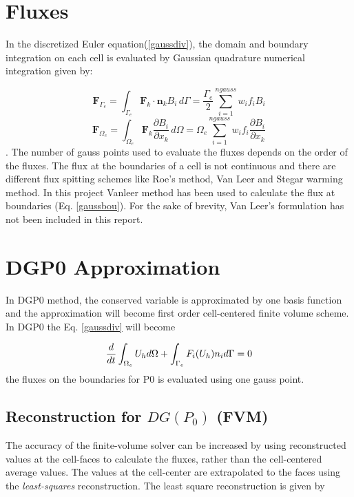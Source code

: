 \documentclass[12pt]{elsarticle}
\begin{document}
	\section{Fluxes}
	In the discretized Euler equation(\ref{gaussdiv}), the domain and boundary integration on each cell is evaluated by Gaussian quadrature numerical integration given by:
	
	\begin{equation}\label{gaussbou}
		\mathbf{F}_{\Gamma_e} = \int_{\Gamma_e} \mathbf{F}_k \cdot \mathbf{n}_k B_i \,d\Gamma = \frac{\Gamma_e}{2} \sum_{i=1}^{ngauss} w_i f_i B_i
	\end{equation}
	\begin{equation}\label{gaussdom}
		\mathbf{F}_{\Omega_e} = \int_{\Omega_e} \mathbf{F}_k \frac{\partial B_i}{\partial x_k}  \,d\Omega = \Omega_e \sum_{i=1}^{ngauss} w_i f_i \frac{\partial B_i}{\partial x_k}
	\end{equation}
	. The number of gauss points used to evaluate the fluxes depends on the order of the fluxes.\newline
	\newline
	The flux at the boundaries of a cell is not continuous and there are different flux spitting schemes like Roe's method, Van Leer and Stegar warming method. In this project Vanleer method has been used to calculate the flux at boundaries (Eq. \ref{gaussbou}). For the sake of brevity, Van Leer's formulation has not been included in this report. 
	
	\section{DGP0 Approximation}
	In DGP0 method, the conserved variable is approximated by one basis function and the approximation will become first order cell-centered finite volume scheme. In DGP0 the Eq. \ref{gaussdiv} will become
	
	\begin{equation}
		\frac{d}{d t} \int_{\Omega_e} U_h d\Omega + \int_{\Gamma_e} F_i(U_h) n_i d\Gamma=0\\
	\end{equation}
	the fluxes on the boundaries for P0 is evaluated using one gauss point.
	
	\subsection{Reconstruction for $DG(P_0)$ (FVM)}
	The accuracy of the finite-volume solver can be increased by using reconstructed values at the cell-faces to calculate the fluxes, rather than the cell-centered average values. The values at the cell-center are extrapolated to the faces using the \textit{least-squares} reconstruction. The least square reconstruction is given by
	
\end{document}
